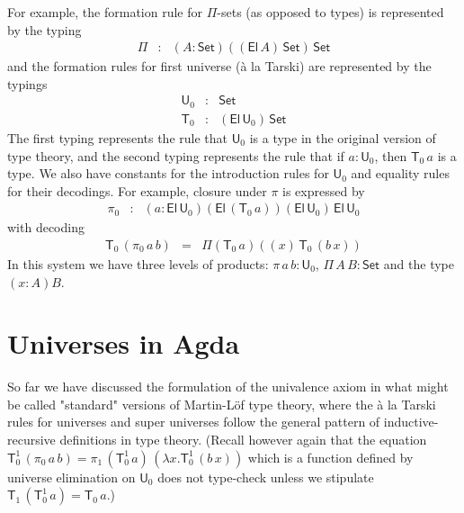 \documentclass[11pt,a4paper]{article}
\def\UU{\mathsf{U}}
\newcommand{\Set}{\mathsf{Set}}
\newcommand{\El}{\mathsf{El}}
\newcommand{\T}{\mathsf{T}}
\begin{document}
For example, the formation rule for $\Pi$-sets (as opposed to types) is represented by the typing
\begin{eqnarray*}
\Pi &:& (A:\Set)((\El\,A)\,\Set)\,\Set
\end{eqnarray*}
and the formation rules for first universe (\`a la Tarski) are represented by the typings
\begin{eqnarray*}
\UU_0 &: &\Set\\
\T_0 &:& (\El\,\UU_0)\,\Set
\end{eqnarray*}
The first typing represents the rule that $\UU_0$ is a type in the original version of type theory, and the second typing represents the rule that if $a : \UU_0$, then $\T_0\,a$ is a type. We also have constants for the introduction rules for $\UU_0$ and equality rules for their decodings. For example, closure under $\pi$ is expressed by
\begin{eqnarray*}
\pi_0 &:& (a:\El\, \UU_0)(\El\, (\T_0\, a))(\El\, \UU_0)\,\El\, \UU_0
\end{eqnarray*}
with decoding
\begin{eqnarray*}
\T_0\, (\pi_0\, a\, b) &=& \Pi (\T_0\, a) ((x)\,\T_0\, (b\, x))
\end{eqnarray*}
In this system we have three levels of products: $\pi\,a\,b : \UU_0$, $\Pi\,A\,B : \Set$ and the type $(x : A)B$.
%
%
%

\section{Universes in Agda}

So far we have discussed the formulation of the univalence axiom in what might be called "standard" versions of Martin-Löf type theory, where the \`a la Tarski rules for universes and super universes follow the general pattern of inductive-recursive definitions in type theory. (Recall however again that the equation
$
\T_0^1\, (\pi_0\,a\, b) = \pi_1\,(\T_0^1\,a)\,(\lambda x.\T_0^1\,(b\,x))
$
which is a function defined by universe elimination on $\UU_0$ does not type-check unless we stipulate $\T_1\, (\T_0^1\, a) = \T_0\, a$.)
\end{document}
